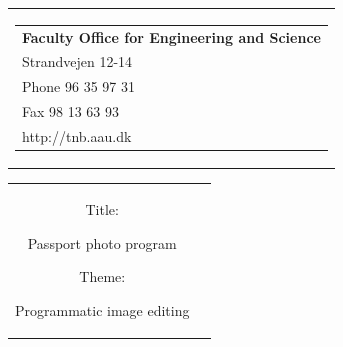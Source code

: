 


% 

\begin{nopagebreak}
{\samepage 
\begin{tabular}{r}
\parbox{\textwidth}{  
\hfill \parbox{8cm}{\begin{tabular}{l}
{\small \textbf{Faculty Office for Engineering and Science }}\\
{\small Strandvejen 12-14} \\
{\small Phone 96 35 97 31} \\
{\small Fax 98 13 63 93} \\
{\small http://tnb.aau.dk}
\end{tabular}}}
\\
\end{tabular}

\begin{tabular}{cc}
\parbox{7cm}{
\begin{description}

\item {Title:} 

Passport photo program
  
\item {Theme:} 

Programmatic image editing

\end{description}

\parbox{8cm}{

}}
\end{tabular}}
\end{nopagebreak}
